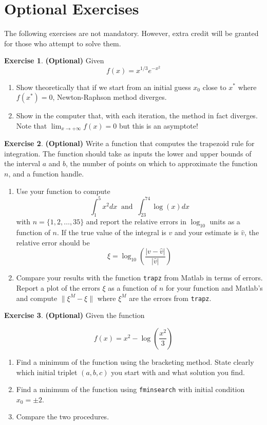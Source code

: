 \documentclass[a4paper,11pt]{article}
\theoremstyle{definition}
\newtheorem{exercise}{Exercise}
\begin{document}
\newpage

\section{Optional Exercises}

The following exercises are not mandatory. However, extra credit will be granted for those who attempt to solve them.

\begin{exercise}{\textbf{(Optional)}}
Given
\[
f(x) = x^{1/3}e^{-x^2}
\]

\begin{enumerate}
    \item Show theoretically that if we start from an initial guess $x_0$ close to $x^*$ where $f(x^*) = 0$, Newton-Raphson method diverges.
    \item Show in the computer that, with each iteration, the method in fact diverges. Note that $\displaystyle\lim_{x\rightarrow +\infty}f(x) = 0$ but this is an asymptote!
\end{enumerate}
\end{exercise}


\begin{exercise}{\textbf{(Optional)}}
Write a function that computes the trapezoid rule for integration. The function should take as inputs the lower and upper bounds of the interval $a$ and $b$, the number of points on which to approximate the function $n$, and a function handle.
\begin{enumerate}
    \item Use your function to compute
    \[
    \int^5_1 x^2 dx \ \text{ and } \ \int^{74}_{23} \log(x) dx
    \]
    with $n = \{1,2,\ldots,35\}$ and report the relative errors in $\log_{10}$ units as a function of $n$. If the true value of the integral is $v$ and your estimate is $\hat{v}$, the relative error should be
    \[
    \xi = \log_{10}\left(\frac{\lvert v - \hat{v}\rvert}{\lvert \hat{v}\rvert}\right)
    \]
    \item Compare your results with the function \verb;trapz; from Matlab in terms of errors. Report a plot of the errors $\xi$ as a function of $n$ for your function and Matlab's and compute $\lVert \xi^M - \xi \rVert$ where $\xi^M$ are the errors from \verb;trapz;.
\end{enumerate}
\end{exercise}


\begin{exercise}{\textbf{(Optional)}}
Given the function 

\[
f(x) = x^2 - \log\left(\frac{x^2}{3}\right)
\]

\begin{enumerate}
    \item Find a minimum of the function using the bracketing method. State clearly which initial triplet $(a,b,c)$ you start with and what solution you find.
    \item Find a minimum of the function using \verb;fminsearch; with initial condition $x_0 = \pm 2$.
    \item Compare the two procedures.
\end{enumerate}
\end{exercise}
\end{document}
